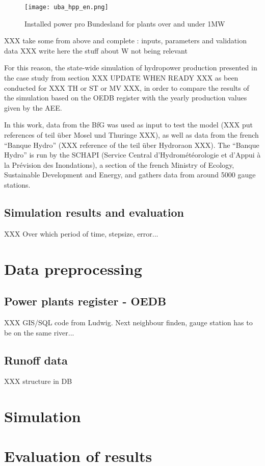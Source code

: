 \begin{figure}[H]
\texttt{[image: uba\_hpp\_en.png]}
\caption[Installed power pro Bundesland for plants over and under 1MW]{Installed power pro Bundesland for plants over and under 1MW \cite{uba_wasserkraft}}
\centering
\label{uba_hpp}
\end{figure}
XXX take some from above and complete : inputs, parameters and validation data
XXX write here the stuff about W not being relevant

For this reason, the state-wide simulation of hydropower production presented in the case study from section XXX UPDATE WHEN READY XXX as been conducted for XXX TH or ST or MV XXX, in order to compare the results of the simulation based on the OEDB register with the yearly production values given by the AEE.

In this work, data from the BfG was used as input to test the model (XXX put references of teil über Mosel und Thuringe XXX), as well as data from the french ``Banque Hydro'' (XXX reference of the teil über Hydroraon XXX). The ``Banque Hydro'' is run by the SCHAPI (Service Central d'Hydrométéorologie et d'Appui à la Prévision des Inondations), a section of the french Ministry of Ecology, Sustainable Development and Energy, and gathers data from around 5000 gauge stations.


\subsection{Simulation results and evaluation}
XXX Over which period of time, stepsize, error...

\section{Data preprocessing}

\subsection{Power plants register - OEDB}
XXX GIS/SQL code from Ludwig. Next neighbour finden, gauge station has to be on the same river...
\subsection{Runoff data}
XXX structure in DB

\section{Simulation}

\section{Evaluation of results}

